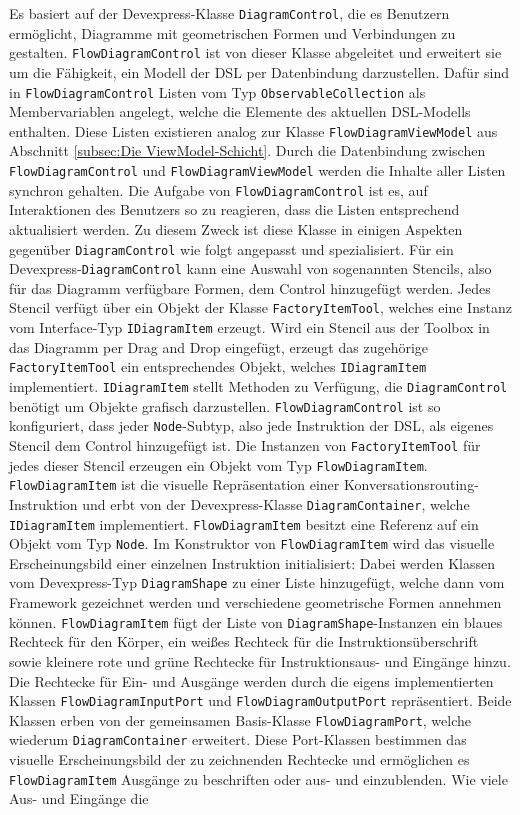 \noindent Es basiert auf der Devexpress-Klasse \texttt{DiagramControl}, die es Benutzern ermöglicht, Diagramme mit geometrischen Formen und Verbindungen zu gestalten. \texttt{Flow\-Dia\-gram\-Con\-trol} ist von dieser Klasse abgeleitet und erweitert sie um die Fähigkeit, ein Modell der DSL per Datenbindung darzustellen. Dafür sind in \texttt{FlowDiagramControl} Listen vom Typ \texttt{ObservableCollection} als Membervariablen angelegt, welche die Elemente des aktuellen DSL-Modells enthalten. Diese Listen existieren analog zur Klasse \texttt{FlowDiagramViewModel} aus Abschnitt \ref{subsec:Die ViewModel-Schicht}. Durch die Datenbindung zwischen \texttt{FlowDiagramControl} und \texttt{FlowDiagramViewModel} werden die Inhalte aller Listen synchron gehalten. Die Aufgabe von \texttt{FlowDiagramControl} ist es, auf Interaktionen des Benutzers so zu reagieren, dass die Listen entsprechend aktualisiert werden. Zu diesem Zweck ist diese Klasse in einigen Aspekten gegenüber \texttt{DiagramControl} wie folgt angepasst und spezialisiert. Für ein Devexpress-\texttt{DiagramControl} kann eine Auswahl von sogenannten Stencils, also für das Diagramm verfügbare Formen, dem Control hinzugefügt werden. Jedes Stencil verfügt über ein Objekt der Klasse \texttt{FactoryItemTool}, welches eine Instanz vom Interface-Typ \texttt{IDiagramItem} erzeugt. Wird ein Stencil aus der Toolbox in das Diagramm per Drag and Drop eingefügt, erzeugt das zugehörige \texttt{FactoryItemTool} ein entsprechendes Objekt, welches \texttt{IDiagramItem} implementiert. \texttt{IDiagramItem} stellt Methoden zu Verfügung, die \texttt{DiagramControl} benötigt um Objekte grafisch darzustellen. \texttt{FlowDiagramControl} ist so konfiguriert, dass jeder \texttt{Node}-Subtyp, also jede Instruktion der DSL, als eigenes Stencil dem Control hinzugefügt ist. Die Instanzen von \texttt{FactoryItemTool} für jedes dieser Stencil erzeugen ein Objekt vom Typ \texttt{FlowDiagramItem}. \texttt{Flow\-Dia\-gram\-Item} ist die visuelle Repräsentation einer Konversationsrouting-Instruktion und erbt von der Devexpress-Klasse \texttt{DiagramContainer}, welche \texttt{IDiagramItem} implementiert. \texttt{Flow\-Dia\-gram\-Item} besitzt eine Referenz auf ein Objekt vom Typ \texttt{Node}. Im Konstruktor von \texttt{FlowDiagramItem} wird das visuelle Erscheinungsbild einer einzelnen Instruktion initialisiert: Dabei werden Klassen vom Devexpress-Typ \texttt{DiagramShape} zu einer Liste hinzugefügt, welche dann vom Framework gezeichnet werden und verschiedene geometrische Formen annehmen können. \texttt{Flow\-Dia\-gram\-Item} fügt der Liste von \texttt{DiagramShape}-Instanzen ein blaues Rechteck für den Körper, ein weißes Rechteck für die Instruktionsüberschrift sowie kleinere rote und grüne Rechtecke für Instruktionsaus- und Eingänge hinzu. Die Rechtecke für Ein- und Ausgänge werden durch die eigens implementierten Klassen \texttt{FlowDiagramInputPort} und \texttt{FlowDiagramOutputPort} repräsentiert. Beide Klassen erben von der gemeinsamen Basis-Klasse \texttt{Flow\-Dia\-gram\-Port}, welche wiederum \texttt{DiagramContainer} erweitert. Diese Port-Klassen bestimmen das visuelle Erscheinungsbild der zu zeichnenden Rechtecke und ermöglichen es \texttt{FlowDiagramItem} Ausgänge zu beschriften oder aus- und einzublenden. Wie viele Aus- und Eingänge die 